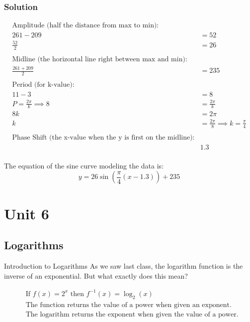 \documentclass{article}
\begin{document}
\begin{minipage}{0.45\textwidth}
\subsubsection*{Solution}
\begin{align*}
\text{Amplitude (half the distance from max to min):} & \\
261 - 209 &= 52 \\
\frac{52}{2} &= 26 \\
\\
\text{Midline (the horizontal line right between max and min):} & \\
\frac{261 + 209}{2} &= 235 \\
\\
\text{Period (for k-value):} & \\
11 - 3 &= 8 \\
P = \frac{2\pi}{k} \implies 8 &= \frac{2\pi}{k} \\
8k &= 2\pi \\
k &= \frac{2\pi}{8} \implies k = \frac{\pi}{4} \\
\\
\text{Phase Shift (the x-value when the y is first on the midline):} & \\
& 1.3 \\
\end{align*}
\end{minipage}

\noindent The equation of the sine curve modeling the data is:
\[
y = 26\sin\left(\frac{\pi}{4}(x - 1.3)\right) + 235
\]
\newpage


\section{Unit 6}
\subsection{Logarithms}

\begin{lessonbox}{Introduction to Logarithms}
As we saw last class, the logarithm function is the inverse of an exponential. But what exactly does this mean?

\[
\begin{aligned}
    &\text{If } f(x) = 2^x \text{ then } f^{-1}(x) = \log_2(x)\\
    &\text{The function returns the value of a power when given an exponent.}\\
    &\text{The logarithm returns the exponent when given the value of a power.}
\end{aligned}
\]
\end{lessonbox}
\end{document}
